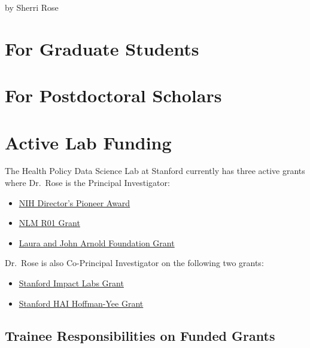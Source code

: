 \documentclass[
]{book}
\providecommand{\tightlist}{%
  \setlength{\itemsep}{0pt}\setlength{\parskip}{0pt}}
\begin{document}
by Sherri Rose

\hypertarget{for-graduate-students}{%
\section{For Graduate Students}\label{for-graduate-students}}

\hypertarget{for-postdoctoral-scholars}{%
\section{For Postdoctoral Scholars}\label{for-postdoctoral-scholars}}

\hypertarget{active-lab-funding}{%
\section{Active Lab Funding}\label{active-lab-funding}}

The Health Policy Data Science Lab at Stanford currently has three active grants where Dr.~Rose is the Principal Investigator:

\begin{itemize}
\tightlist
\item
  \href{https://reporter.nih.gov/search/ghBZmjOA8UyUXCt3VGZAZg/project-details/10485672}{NIH Director's Pioneer Award}
\item
  \href{https://reporter.nih.gov/search/ghBZmjOA8UyUXCt3VGZAZg/project-details/10676234}{NLM R01 Grant}
\item
  \href{https://www.arnoldventures.org/grants/the-board-of-trustees-of-the-leland-stanford-junior-university-10}{Laura and John Arnold Foundation Grant}
\end{itemize}

Dr.~Rose is also Co-Principal Investigator on the following two grants:

\begin{itemize}
\tightlist
\item
  \href{https://impact.stanford.edu/organization/health-care-fairness-impact-lab}{Stanford Impact Labs Grant}
\item
  \href{https://hai.stanford.edu/2022-hoffman-yee-grant-recipients\#eae}{Stanford HAI Hoffman-Yee Grant}
\end{itemize}

\hypertarget{trainee-responsibilities-on-funded-grants}{%
\subsection{Trainee Responsibilities on Funded Grants}\label{trainee-responsibilities-on-funded-grants}}
\end{document}
